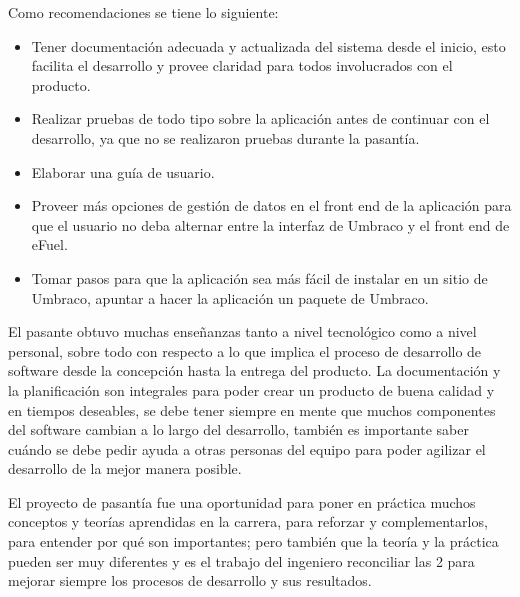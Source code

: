 Como recomendaciones se tiene lo siguiente:
\begin{itemize}
    \item Tener documentación adecuada y actualizada del sistema desde el inicio, esto facilita el desarrollo y provee claridad para todos involucrados con el producto.
    \item Realizar pruebas de todo tipo sobre la aplicación antes de continuar con el desarrollo, ya que no se realizaron pruebas durante la pasantía.
    \item Elaborar una guía de usuario.
    \item Proveer más opciones de gestión de datos en el front end de la aplicación para que el usuario no deba alternar entre la interfaz de Umbraco y el front end de eFuel.
    \item Tomar pasos para que la aplicación sea más fácil de instalar en un sitio de Umbraco, apuntar a hacer la aplicación un paquete de Umbraco.
\end{itemize}

El pasante obtuvo muchas enseñanzas tanto a nivel tecnológico como a nivel personal, sobre todo con respecto a lo que implica el proceso de desarrollo de software desde la concepción hasta la entrega del producto. La documentación y la planificación son integrales para poder crear un producto de buena calidad y en tiempos deseables, se debe tener siempre en mente que muchos componentes del software cambian a lo largo del desarrollo, también es importante saber cuándo se debe pedir ayuda a otras personas del equipo para poder agilizar el desarrollo de la mejor manera posible.

El proyecto de pasantía fue una oportunidad para poner en práctica muchos conceptos y teorías aprendidas en la carrera, para reforzar y complementarlos, para entender por qué son importantes; pero también que la teoría y la práctica pueden ser muy diferentes y es el trabajo del ingeniero reconciliar las 2 para mejorar siempre los procesos de desarrollo y sus resultados.
